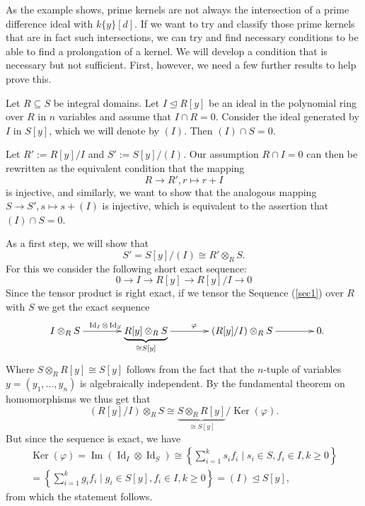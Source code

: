 As the example shows, prime kernels are not always the intersection of a prime difference ideal with $k\{y\}[d]$. 
If we want to try and classify those prime kernels that are in fact such intersections, we can try and find necessary conditions to be able to find a prolongation of a kernel. 
We will develop a condition that is necessary but not sufficient. First, however, we need a few further results to help prove this.

\begin{prop} \label{idealzeroabove}
Let $R \subseteq S$ be integral domains. Let $I \unlhd R[y]$ be an ideal in the polynomial ring over $R$ in $n$ variables and assume that
$I \cap R = 0$. Consider the ideal generated by $I$ in $S[y]$, which we will denote by $(I)$. 
Then $(I) \cap S = 0$.
\begin{bew}
Let $R':= R[y]/I$ and $S' := S[y]/(I)$. 
Our assumption $R \cap I = 0$ can then be rewritten as the equivalent condition that the mapping 
$$  R \rightarrow R', r \mapsto r + I $$
is injective, and similarly, we want to show that the analogous mapping $S \rightarrow S', s \mapsto s + (I)$ is injective, 
which is equivalent to the assertion that $(I) \cap S = 0$.

As a first step, we will show that 
$$ S' = S[y]/(I) \cong R' \otimes_R S.$$
For this we consider the following short exact sequence:
\begin{equation}\label{sec1}
0 \rightarrow I \rightarrow R[y] \rightarrow R[y]/I \rightarrow 0
\end{equation}
Since the tensor product is right exact, if we tensor the Sequence (\ref{sec1}) over $R$ with $S$ we get the exact sequence
\[
\begin{xy}
\xymatrixcolsep{3.2pc}
 \xymatrix{
I \otimes_R S \ar[r]^{\operatorname{Id}_I \otimes \operatorname{Id}_S} & \underbrace{ R[y] \otimes_R S}_{\cong S[y]} \ar[r]^\varphi & (R[y]/I) \otimes_R S  \ar[r] &  0 }
\end{xy}.
\]
Where $S \otimes_R R[y] \cong S[y]$ follows from the fact that the $n$-tuple of variables $y = (y_1,\ldots,y_n)$ is algebraically independent.  By the fundamental theorem on homomorphisms we thus get that $$(R[y]/I) \otimes_R S \cong \underbrace{ S \otimes_R R[y]}_{\cong S[y]}/\operatorname{Ker}(\varphi).$$
But since the sequence is exact, we have
\begin{align*} \operatorname{Ker}(\varphi) = \operatorname{Im}(\operatorname{Id}_I \otimes \operatorname{Id}_S) \cong \left\{ \sum_{i = 1}^k s_i f_i \mid s_i \in S, f_i \in I, k \geq 0 \right\} \\ =  \left\{ \sum_{i = 1}^k g_i f_i \mid g_i \in S[y], f_i \in I, k \geq 0 \right\} = (I) \unlhd S[y], \end{align*}
from which the statement follows.



\end{bew}
\end{prop}
